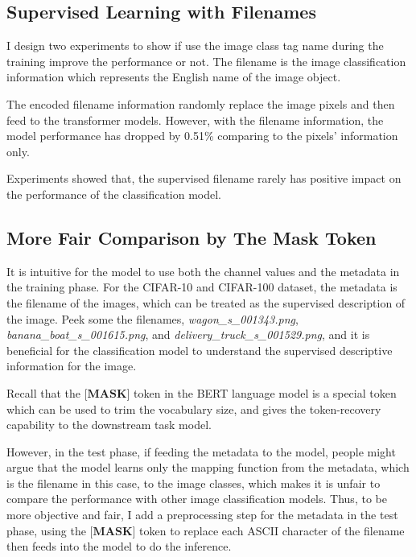 \documentclass[10pt,twocolumn,letterpaper]{article}
\begin{document}
\subsection{Supervised Learning with Filenames}

\par I design two experiments to show if use the image class tag name during the training improve the performance or not.
The filename is the image classification information which represents the English name of the image object.

The encoded filename information randomly replace the image pixels and then feed to the transformer models.
However, with the filename information, the model performance has dropped by 0.51\% comparing to the pixels' information only.

Experiments showed that, the supervised filename rarely has positive impact on the performance of the classification model.

\subsection{More Fair Comparison by The Mask Token}

\par It is intuitive for the model to use both the channel values and the metadata in the training phase.
For the CIFAR-10 and CIFAR-100 dataset, the metadata is the filename of the images, which can be treated as the supervised description of the image.
Peek some the filenames, \eg \textit{wagon\_s\_001343.png}, \textit{banana\_boat\_s\_001615.png}, and \textit{delivery\_truck\_s\_001529.png},
and it is beneficial for the classification model to understand the supervised descriptive information for the image.

\par Recall that the $\textbf{[MASK]}$ token in the BERT language model is a special token which can be used to trim the vocabulary size,
and gives the token-recovery capability to the downstream task model.

\par However, in the test phase, if feeding the metadata to the model, people might argue that the model learns only the mapping function from
the metadata, which is the filename in this case, to the image classes, which makes it is unfair to compare the performance with other image classification models.
Thus, to be more objective and fair, I add a preprocessing step for the metadata in the test phase, using the $\textbf{[MASK]}$ token to replace each
ASCII character of the filename then feeds into the model to do the inference.
\end{document}
